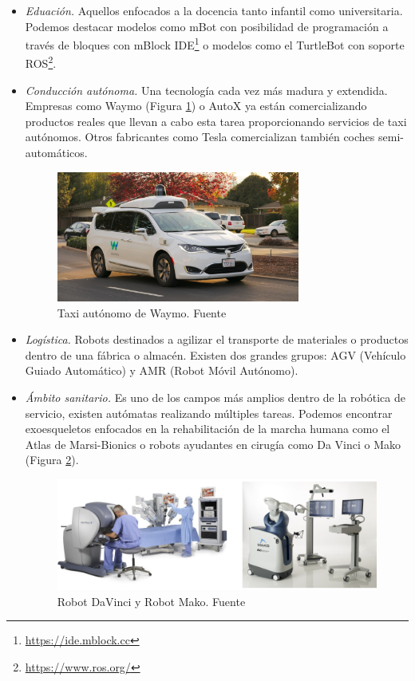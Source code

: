 \begin{itemize}
\item \textit{Eduación.} Aquellos enfocados a la docencia tanto infantil como universitaria. Podemos destacar modelos como mBot con posibilidad de programación a través de bloques con mBlock IDE\footnote{\url{https://ide.mblock.cc}} o modelos como el TurtleBot con soporte ROS\footnote{\url{https://www.ros.org/}}.

\item \textit{Conducción autónoma.} Una tecnología cada vez más madura y extendida. Empresas como Waymo (Figura \ref{fig:waymo}) o AutoX ya están comercializando productos reales que llevan a cabo esta tarea proporcionando servicios de taxi autónomos. Otros fabricantes como Tesla comercializan también coches semi-automáticos.\\

\begin{figure} [h!]
  \begin{center}
    \includegraphics[width=8cm]{figs/waymo.jpg}
  \end{center}
  \caption{Taxi autónomo de Waymo. Fuente \cite{xataka}}
  \label{fig:waymo}
\end{figure}

\item \textit{Logística.} Robots destinados a agilizar el transporte de materiales o productos dentro de una fábrica o almacén. Existen dos grandes grupos: AGV (Vehículo Guiado Automático) y AMR (Robot Móvil Autónomo).

\item \textit{Ámbito sanitario.} Es uno de los campos más amplios dentro de la robótica de servicio, existen autómatas realizando múltiples tareas. Podemos encontrar exoesqueletos enfocados en la rehabilitación de la marcha humana como el Atlas de Marsi-Bionics o robots ayudantes en cirugía como Da Vinci o Mako (Figura \ref{fig:robots_cirugia}).

\begin{figure} [h!]
  \begin{center}
    \includegraphics[width=12cm]{figs/robots_cirugia.png}
  \end{center}
  \caption{Robot DaVinci y Robot Mako. Fuente \cite{davinci} \cite{mako}}
  \label{fig:robots_cirugia}
\end{figure}


\end{itemize}
